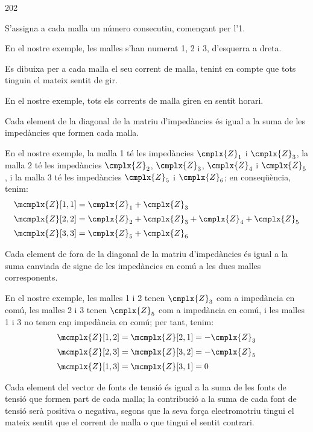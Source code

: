 \begin{dingautolist}{202}
   \item S'assigna a cada malla un número consecutiu, començant per l'1.

          En el nostre exemple, les malles s'han numerat 1, 2 i 3, d'esquerra a dreta.
   \item Es dibuixa per a  cada malla el seu corrent de malla, tenint en compte que tots tinguin el mateix sentit de gir.

       En el nostre exemple, tots els corrents de malla giren en sentit horari.

   \item Cada element de la diagonal de la matriu d'impedàncies és igual a la suma de les impedàncies que formen cada malla.

       En el nostre exemple, la malla 1 té les impedàncies $\cmplx{Z}_1$ i $\cmplx{Z}_3$, la malla 2 té les impedàncies $\cmplx{Z}_2$, $\cmplx{Z}_3$, $\cmplx{Z}_4$ i $\cmplx{Z}_5$, i la malla 3 té les impedàncies $\cmplx{Z}_5$ i $\cmplx{Z}_6$; en conseqüència,  tenim:
        \begin{align*}
          \mcmplx{Z}[1,1] &=\cmplx{Z}_1 + \cmplx{Z}_3 \\[0.5ex]
          \mcmplx{Z}[2,2] &=\cmplx{Z}_2 + \cmplx{Z}_3+ \cmplx{Z}_4+ \cmplx{Z}_5 \\[0.5ex]
          \mcmplx{Z}[3,3] &=\cmplx{Z}_5 + \cmplx{Z}_6
        \end{align*}

   \item Cada element de fora de la diagonal de la matriu d'impedàncies és igual a la suma canviada de signe de les impedàncies en comú a les dues malles corresponents.

        En el nostre exemple, les malles 1 i 2 tenen $\cmplx{Z}_3$ com a impedància en comú, les malles 2 i 3 tenen $\cmplx{Z}_5$ com a impedància en comú, i les malles 1 i 3 no tenen cap impedància en comú; per tant,  tenim:
        \begin{align*}
            \mcmplx{Z}[1,2]=\mcmplx{Z}[2,1] &= -\cmplx{Z}_3 \\[0.5ex]
            \mcmplx{Z}[2,3]=\mcmplx{Z}[3,2] &= -\cmplx{Z}_5 \\[0.5ex]
            \mcmplx{Z}[1,3]=\mcmplx{Z}[3,1] &= 0
        \end{align*}

    \item Cada element del vector de fonts de tensió és igual a la suma de les fonts de tensió que formen part de cada malla; la contribució a la suma de cada font de tensió serà positiva o negativa, segons que la seva força electromotriu tingui el mateix sentit que el corrent de malla o que  tingui el sentit contrari.


\end{dingautolist}
